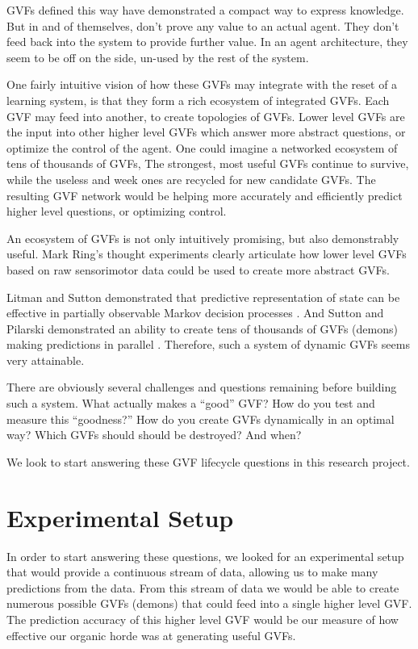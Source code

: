 \documentclass[letterpaper]{article}
\begin{document}
GVFs defined this way have demonstrated a compact way to express knowledge. But in and of themselves, don't prove any value to an actual agent. They don't feed back into the system to provide further value. In an agent architecture, they seem to be off on the side, un-used by the rest of the system.

One fairly intuitive vision of how these GVFs may integrate with the reset of a learning system, is that they form a rich ecosystem of integrated GVFs. Each GVF may feed into another, to create topologies of GVFs. Lower level GVFs are the input into other higher level GVFs which answer more abstract questions, or optimize the control of the agent. One could imagine a networked ecosystem of tens of thousands of GVFs, The strongest, most useful GVFs continue to survive, while the useless and week ones are recycled for new candidate GVFs. The resulting GVF network would be helping more accurately and efficiently predict higher level questions, or optimizing control.

An ecosystem of GVFs is not only intuitively promising, but also demonstrably useful. Mark Ring's thought experiments \cite{representingknowledge} clearly articulate how lower level GVFs based on raw sensorimotor data could be used to create more abstract GVFs. 

Litman and Sutton demonstrated that predictive representation of state can be effective in partially observable Markov decision processes \cite{littman2002predictive}. And Sutton and Pilarski demonstrated an ability to create tens of thousands of GVFs (demons) making predictions in parallel \cite{sutton2011horde}. Therefore, such a system of dynamic GVFs seems very attainable. 

There are obviously several challenges and questions remaining before building such a system. What actually makes a ``good'' GVF? How do you test and measure this ``goodness?'' How do you create GVFs dynamically in an optimal way? Which GVFs should should be destroyed? And when?

We look to start answering these GVF lifecycle questions in this research project.


\section{Experimental Setup}
In order to start answering these questions, we looked for an experimental setup that would provide a continuous stream of data, allowing us to make many predictions from the data. From this stream of data we would be able to create numerous possible GVFs (demons) that could feed into a single higher level GVF. The prediction accuracy of this higher level GVF would be our measure of how effective our organic horde was at generating useful GVFs. 
\end{document}
